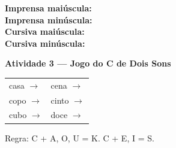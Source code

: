\begin{consolidacao}
\begin{center}
\textbf{Imprensa mai\'uscula:} \underline{\hspace{1cm}} \underline{\hspace{1cm}} \underline{\hspace{1cm}} \underline{\hspace{1cm}} \underline{\hspace{1cm}}\\[0.5em]
\textbf{Imprensa min\'uscula:} \underline{\hspace{1cm}} \underline{\hspace{1cm}} \underline{\hspace{1cm}} \underline{\hspace{1cm}} \underline{\hspace{1cm}}\\[0.5em]
\textbf{Cursiva mai\'uscula:} \underline{\hspace{1cm}} \underline{\hspace{1cm}} \underline{\hspace{1cm}} \underline{\hspace{1cm}} \underline{\hspace{1cm}}\\[0.5em]
\textbf{Cursiva min\'uscula:} \underline{\hspace{1cm}} \underline{\hspace{1cm}} \underline{\hspace{1cm}} \underline{\hspace{1cm}} \underline{\hspace{1cm}}
\end{center}

\textbf{Atividade 3 --- Jogo do C de Dois Sons}


\begin{center}
\begin{tabular}{ll}
casa \quad $\rightarrow$ \underline{\hspace{2cm}} & cena \quad $\rightarrow$ \underline{\hspace{2cm}} \\
copo \quad $\rightarrow$ \underline{\hspace{2cm}} & cinto \quad $\rightarrow$ \underline{\hspace{2cm}} \\
cubo \quad $\rightarrow$ \underline{\hspace{2cm}} & doce \quad $\rightarrow$ \underline{\hspace{2cm}}
\end{tabular}
\end{center}
Regra: C + A, O, U = K. C + E, I = S.

\end{consolidacao}

